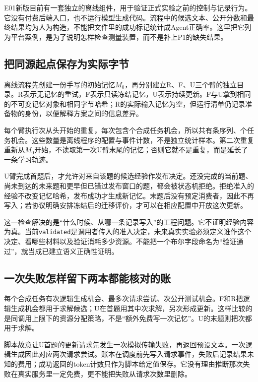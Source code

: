 E01新版目前有一套独立的离线组件，用于验证正式实验之前的控制与记录行为。它没有付费后端入口，也不运行模型生成代码。流程中的候选文本、公开分数和最终结果均为人为构造，不能把文件里的成功标记统计成Agent正确率。这里把它列为平台案例，是为了说明怎样检查测量装置，而不是补上P1的缺失结果。

\subsection{把同源起点保存为实际字节}

离线流程先创建一份手写的初始记忆$M_0$，再分别建立R、F、U三个臂的独立目录。R表示无记忆的重试，F表示只读冻结记忆，U表示持续更新。F与U拿到相同的不可变记忆对象和相同字节哈希；R的实际输入记忆为空，但运行清单仍记录准备物的身份，以便解释方案之间的信息差异。

每个臂执行次从头开始的重复，每次包含个合成任务机会，所以共有条序列、个任务机会。这些数量是离线程序的配置与事件计数，不是独立统计样本。第二次重复重新从$M_0$开始，不读取第一次U臂末尾的记忆；否则它就不是重复，而是延长了一条学习轨迹。

U臂完成首题后，才允许对来自该题的候选经验作发布决定。还没完成的当前题、尚未到达的未来题和更早但已错过发布窗口的题，都会被状态机拒绝。拒绝准入的经验不改变记忆哈希，发布成功才生成新记忆。末题后没有预定消费者，因此不再写入；若协议明确安排冻结后的迁移评价，才可以在相应配置中开放这次更新。

这一检查解决的是“什么时候、从哪一条记录写入”的工程问题。它不证明经验内容为真。当前\texttt{validated}是调用者传入的准入决定，未来真实实验必须定义谁作这个决定、看哪些材料以及验证消耗多少资源。不能把一个布尔字段命名为“验证通过”，就当成已建立语义正确性证明。

\subsection{一次失败怎样留下两本都能核对的账}

每个合成任务有次逻辑生成机会、最多次请求尝试、次公开测试机会。F和R把逻辑生成机会都用于求解候选；U在首题用其中次求解，另次形成更新。这样比较的是同调用上限下的资源分配策略，不是“额外免费写一次记忆”。U的末题则把次都用于求解。

脚本故意让U首题的更新请求先发生一次模拟传输失败，再返回预设文本。一次逻辑生成因此对应两次请求尝试。账本在调度前先写入请求事件，失败后记录结果未知的费用；成功返回的token计数只作为脚本给定值保存。它没有理由推断那次失败在真实服务里一定免费，更不能把失败从请求次数里删除。

